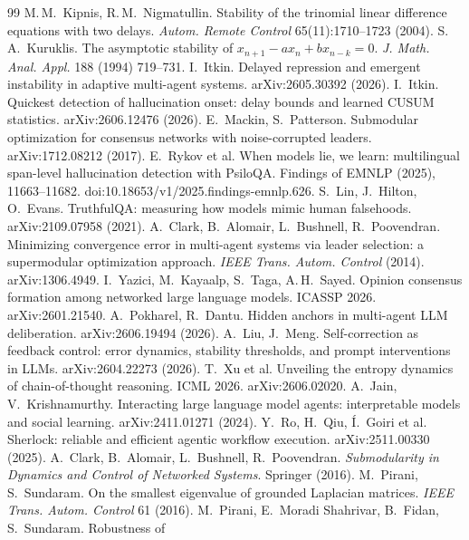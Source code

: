 \documentclass[11pt]{article}
\theoremstyle{definition}
\begin{document}
\begin{thebibliography}{99}
 M.\,M.\ Kipnis, R.\,M.\ Nigmatullin. Stability of the trinomial linear
difference equations with two delays. \emph{Autom. Remote Control} 65(11):1710--1723 (2004).
 S.\,A.\ Kuruklis. The asymptotic stability of $x_{n+1}-a x_n+b x_{n-k}=0$. \emph{J.
Math. Anal. Appl.} 188 (1994) 719--731.
 I.\ Itkin. Delayed repression and emergent instability in adaptive multi-agent
systems. arXiv:2605.30392 (2026).
 I.\ Itkin. Quickest detection of hallucination onset: delay bounds and learned
CUSUM statistics. arXiv:2606.12476 (2026).
 E.\ Mackin, S.\ Patterson. Submodular optimization for consensus networks
with noise-corrupted leaders. arXiv:1712.08212 (2017).
 E.\ Rykov et al. When models lie, we learn: multilingual span-level hallucination
detection with PsiloQA. Findings of EMNLP (2025), 11663--11682. doi:10.18653/v1/2025.findings-emnlp.626.
 S.\ Lin, J.\ Hilton, O.\ Evans. TruthfulQA: measuring how models mimic human
falsehoods. arXiv:2109.07958 (2021).
 A.\ Clark, B.\ Alomair, L.\ Bushnell, R.\ Poovendran. Minimizing convergence
error in multi-agent systems via leader selection: a supermodular optimization approach. \emph{IEEE
Trans. Autom. Control} (2014). arXiv:1306.4949.
 I.\ Yazici, M.\ Kayaalp, S.\ Taga, A.\,H.\ Sayed. Opinion consensus
formation among networked large language models. ICASSP 2026. arXiv:2601.21540.
 A.\ Pokharel, R.\ Dantu. Hidden anchors in multi-agent LLM deliberation.
arXiv:2606.19494 (2026).
 A.\ Liu, J.\ Meng. Self-correction as feedback control: error dynamics,
stability thresholds, and prompt interventions in LLMs. arXiv:2604.22273 (2026).
 T.\ Xu et al. Unveiling the entropy dynamics of chain-of-thought reasoning. ICML
2026. arXiv:2606.02020.
 A.\ Jain, V.\ Krishnamurthy. Interacting large language model agents:
interpretable models and social learning. arXiv:2411.01271 (2024).
 Y.\ Ro, H.\ Qiu, \'I.\ Goiri et al. Sherlock: reliable and efficient agentic
workflow execution. arXiv:2511.00330 (2025).
 A.\ Clark, B.\ Alomair, L.\ Bushnell, R.\ Poovendran. \emph{Submodularity in
Dynamics and Control of Networked Systems}. Springer (2016).
 M.\ Pirani, S.\ Sundaram. On the smallest eigenvalue of grounded Laplacian
matrices. \emph{IEEE Trans. Autom. Control} 61 (2016).
 M.\ Pirani, E.\ Moradi Shahrivar, B.\ Fidan, S.\ Sundaram. Robustness of

\end{thebibliography}
\end{document}

